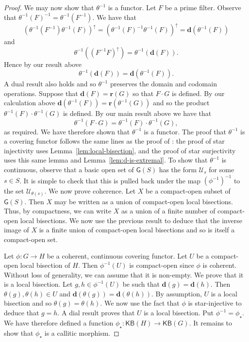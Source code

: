 \documentclass[a4paper]{amsart}
\begin{document}
\begin{proof}
We may now show that $\theta^{-1}$ is a functor.
Let $F$ be a prime filter.
Observe that $\theta^{-1}(F)^{-1} = \theta^{-1} (F^{-1})$.
We have that
$$(\theta^{-1} (F^{-1}) \theta^{-1} (F))^{\uparrow}
=
(\theta^{-1} (F)^{-1} \theta^{-1} (F))^{\uparrow}
=
\mathbf{d} ( \theta^{-1} (F))$$
and
$$\theta^{-1} ( (F^{-1}F)^{\uparrow} ) = \theta^{-1} (\mathbf{d} (F)).$$
Hence by our result above
$$\theta^{-1} (\mathbf{d} (F))
=
\mathbf{d} ( \theta^{-1} (F)).$$
A dual result also holds and so $\theta^{-1}$ preserves the domain and codomain operations.
Suppose that $\mathbf{d}(F) = \mathbf{r} (G)$ so that $F \cdot G$ is defined.
By our calculation above $\mathbf{d} (\theta^{-1}(F)) = \mathbf{r} (\theta^{-1} (G))$
and so the product $\theta^{-1} (F) \cdot \theta^{-1} (G)$ is defined.
By our main result above we have that
$$\theta^{-1} (F \cdot G) = \theta^{-1} (F) \cdot \theta^{-1} (G),$$
as required.
We have therefore shown that $\theta^{-1}$ is a functor.
The proof that $\theta^{-1}$ is a covering functor follows the same lines as the proof of \cite[Proposition~2.15]{Lawson3}:
the proof of star injectivity uses Lemma~\ref{lem:local-bisection},
and the proof of star surjectivity uses this same lemma and Lemma~\ref{lem:d-is-extremal}.
To show that $\theta^{-1}$ is continuous, observe that 
a basic open set of $\mathsf{G}(S)$ has the form $\mathscr{U}_{s}$ for some $s \in S$.
It is simple to check that this is pulled back under the map $(\phi^{-1})^{-1}$ to the set $\mathscr{U}_{\theta (s)}$.
We now prove coherence.
Let $X$ be a compact-open subset of $\mathsf{G}(S)$.
Then $X$ may be written as a union of compact-open local bisections.
Thus, by compactness, we can write $X$ as a union of a finite number of compact-open local bisections.
We now use the previous result to deduce that the inverse image of $X$ is a finite union of compact-open local bisections
and so is itself a compact-open set.

Let $\phi \colon G \rightarrow H$ be a  coherent, continuous covering functor.
Let $U$ be a compact-open local bisection of $H$.
Then $\phi^{-1}(U)$ is compact-open since $\phi$ is coherent.
Without loss of generality, we can assume that it is non-empty.
We prove that it is a local bisection.
Let $g,h \in \phi^{-1}(U)$ be such that $\mathbf{d}(g) = \mathbf{d}(h)$.
Then $\theta (g), \theta (h) \in U$ and $\mathbf{d}(\theta (g)) = \mathbf{d}(\theta (h))$.
By assumption, $U$ is a local bisection and so $\theta (g) = \theta (h)$.
We now use the fact that $\phi$ is star-injective to deduce that $g = h$.
A dial result proves that $U$ is a local bisection.
Put $\phi^{-1} = \phi_{\star}$.
We have therefore defined a function
$\phi_{\star} \colon \mathsf{KB}(H) \rightarrow \mathsf{KB}(G)$.
It remains to show that $\phi_{\star}$ is a callitic morphism.


\end{proof}
\end{document}
